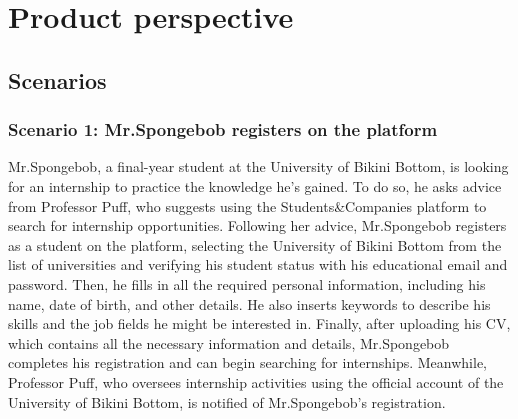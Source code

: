 \renewcommand{\thesection}{\Alph{section}}
\section{Product perspective}\label{sec:product_perspective}
\subsection{Scenarios}\label{subsec:scenarios}
\subsubsection{Scenario 1: Mr.Spongebob registers on the platform}\label{subsubsec:scenario_1}
Mr.Spongebob, a final-year student at the University of Bikini Bottom, is looking for an internship to practice the knowledge he's gained. 
To do so, he asks advice from Professor Puff, who suggests using the Students\&Companies platform to search for internship opportunities.
Following her advice, Mr.Spongebob registers as a student on the platform, selecting the University of Bikini Bottom from the list of 
universities and verifying his student status with his educational email and password. Then, he fills in all the required personal information,
including his name, date of birth, and other details. He also inserts keywords to describe his skills and the job fields he might be interested 
in. Finally, after uploading his CV, which contains all the necessary information and details, Mr.Spongebob completes his registration and 
can begin searching for internships. Meanwhile, Professor Puff, who oversees internship activities using the official account of the University of 
Bikini Bottom, is notified of Mr.Spongebob's registration.

